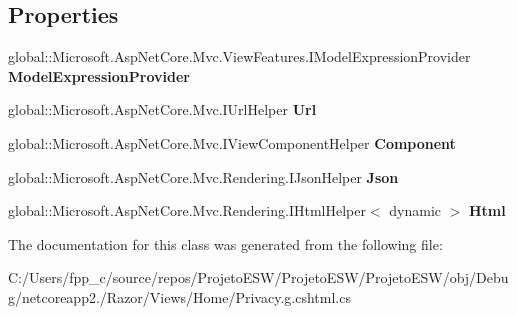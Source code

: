 \subsection*{Properties}
\begin{DoxyCompactItemize}
\item 
\mbox{\label{class_asp_net_core_1_1_views___home___privacy_a3cc59985aec7c9dce1028500d154b3c7}} 
global\+::\+Microsoft.\+Asp\+Net\+Core.\+Mvc.\+View\+Features.\+I\+Model\+Expression\+Provider {\bfseries Model\+Expression\+Provider}
\item 
\mbox{\label{class_asp_net_core_1_1_views___home___privacy_a5a039307e10eaf4d906d02dfe97a65d2}} 
global\+::\+Microsoft.\+Asp\+Net\+Core.\+Mvc.\+I\+Url\+Helper {\bfseries Url}
\item 
\mbox{\label{class_asp_net_core_1_1_views___home___privacy_aa22f10dda47ce167b7fea2a04c07b362}} 
global\+::\+Microsoft.\+Asp\+Net\+Core.\+Mvc.\+I\+View\+Component\+Helper {\bfseries Component}
\item 
\mbox{\label{class_asp_net_core_1_1_views___home___privacy_a6fa73597180a3d7a8765ee2df83ee850}} 
global\+::\+Microsoft.\+Asp\+Net\+Core.\+Mvc.\+Rendering.\+I\+Json\+Helper {\bfseries Json}
\item 
\mbox{\label{class_asp_net_core_1_1_views___home___privacy_ad1ea44b1fae06251aeab7ad208fc61c4}} 
global\+::\+Microsoft.\+Asp\+Net\+Core.\+Mvc.\+Rendering.\+I\+Html\+Helper$<$ dynamic $>$ {\bfseries Html}
\end{DoxyCompactItemize}


The documentation for this class was generated from the following file\+:\begin{DoxyCompactItemize}
\item 
C\+:/\+Users/fpp\+\_\+c/source/repos/\+Projeto\+E\+S\+W/\+Projeto\+E\+S\+W/\+Projeto\+E\+S\+W/obj/\+Debug/netcoreapp2./\+Razor/\+Views/\+Home/Privacy.\+g.\+cshtml.\+cs\end{DoxyCompactItemize}
